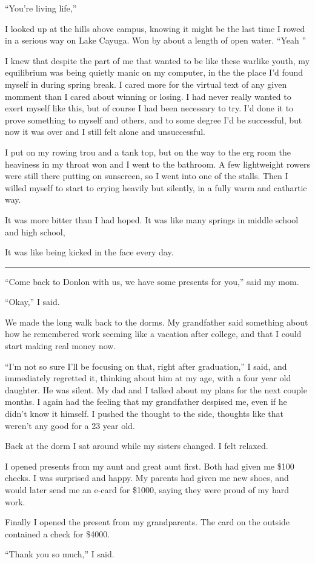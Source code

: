 ``You're living life,''

I looked up at the hills above campus, knowing it might be the last time I rowed
in a serious way on Lake Cayuga.  Won by about a length of open water.  ``Yeah
'' 

I knew that despite the part of me that wanted to be like these warlike youth,
my equilibrium was being quietly manic on my computer, in the the place I'd
found myself in during spring break.  I cared more for the virtual text of any
given momment than I cared about winning or losing.  I had never really wanted
to exert myself like this, but of course I had been necessary to try.  I'd done
it to prove something to myself and others, and to some degree I'd be
successful, but now it was over and I still felt alone and unsuccessful.

I put on my rowing trou and a tank top, but on the way to the erg room the
heaviness in my throat won and I went to the bathroom.  A few lightweight
rowers were still there putting on sunscreen, so I went into one of the stalls.
Then I willed myself to start to crying heavily but silently, in a fully warm
and cathartic way.  

It was more bitter than I had hoped.  It was like many springs in middle school
and high school, 

It was like being kicked in the face every day.

\plainfancybreak{12pt}{2}{* * *}

``Come back to Donlon with us, we have some presents for you,'' said my mom. 

``Okay,'' I said.  

We made the long walk back to the dorms.  My grandfather said something about
how he remembered work seeming like a vacation after college, and that I could
start making real money now.

``I'm not so sure I'll be focusing on that, right after graduation,'' I said,
and immediately regretted it, thinking about him at my age, with a four year old
daughter.  He was silent.  My dad and I talked about my plans for the next
couple months.  I again had the feeling that my grandfather despised me, even if
he didn't know it himself.  I pushed the thought to the side, thoughts like that
weren't any good for a 23 year old.

Back at the dorm I sat around while my sisters changed.  I felt relaxed.

I opened presents from my aunt and great aunt first.  Both had given me \$100
checks.  I was surprised and happy.  My parents had given me new shoes, and
would later send me an e-card for \$1000, saying they were proud of my hard
work.  

Finally I opened the present from my grandparents.  The card on the outside
contained a check for \$4000.  

``Thank you so much,'' I said.
